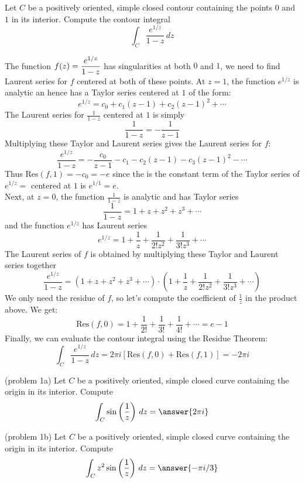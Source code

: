 \documentclass[handout]{ximera}
\begin{document}
\begin{example}[example 1b]
Let $C$ be a positively oriented, simple closed contour containing the points $0$ and $1$ in its interior.
Compute the contour integral
\[
\int_C \frac{e^{1/z}}{1-z} \, dz
\]

The function $\displaystyle f(z) = \frac{e^{1/z}}{1-z}$ has singularities at both $0$ and $1$, we need to find Laurent series for $f$
centered at both of these points.
At $z = 1$, the function $e^{1/z}$ is analytic an hence has a Taylor series centered at $1$ of the form:
\[
e^{1/z} = c_0 + c_1(z-1) + c_2(z-1)^2 + \cdots
\]
The Laurent series for $\frac{1}{1-z}$ centered at $1$ is simply
\[
\frac{1}{1-z} = -\frac{1}{z-1}
\]
Multiplying these Taylor and Laurent series gives the Laurent series for $f$:
\[
\frac{e^{1/z}}{1-z} = -\frac{c_0}{z-1} -c_1 -c_2(z-1) - c_3(z-1)^2 - \cdots
\]
Thus Res$(f, 1) = -c_0 = -e$ since the is the constant term of the Taylor series of $e^{1/z} =$ centered at $1$ is $e^{1/1} =e$.\\
Next, at $z = 0$, the function $\frac{1}{1-z}$ is analytic and has Taylor series
\[
\frac{1}{1-z} = 1 + z + z^2 + z^3 + \cdots
\]
and the function $e^{1/z}$ has Laurent series
\[
e^{1/z} = 1 + \frac{1}{z} + \frac{1}{2! z^2} + \frac{1}{3! z^3} + \cdots
\]
The Laurent series of $f$ is obtained by multiplying these Taylor and Laurent series together
\[
\frac{e^{1/z}}{1-z} = \left(1 + z + z^2 + z^3 + \cdots\right) \cdot \left( 1 + \frac{1}{z} + \frac{1}{2! z^2} + \frac{1}{3! z^3} + \cdots\right)
\]
We only need the residue of $f$, so let's compute the coefficient of $\frac{1}{z}$ in the product above.
We get:
\[
\text{Res}(f, 0) = 1 + \frac{1}{2!} +\frac{1}{3!} + \frac{1}{4!} + \cdots = e-1
\]
Finally, we can evaluate the contour integral using the Residue Theorem:
\[
\int_C \frac{e^{1/z}}{1-z} \, dz = 2\pi i \left[\text{Res}(f,0) + \text{Res}(f,1)\right] = -2\pi i
\]
\end{example}


\begin{problem}(problem 1a)
Let $C$ be a positively oriented, simple closed curve containing the origin in its interior. Compute
\[
\int_C \sin\left(\frac{1}{z}\right) \, dz = \answer{2\pi i}
\]

\end{problem}

\begin{problem}(problem 1b)
Let $C$ be a positively oriented, simple closed curve containing the origin in its interior. Compute
\[
\int_C z^2\sin\left(\frac{1}{z}\right) \, dz = \answer{-\pi i/3}
\]

\end{problem}
\end{document}

